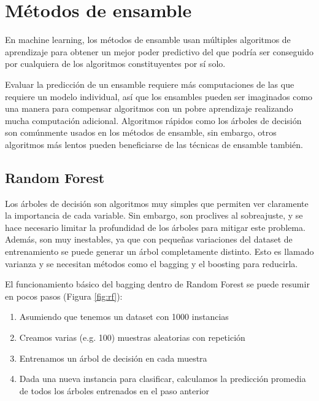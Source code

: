 \section{Métodos de ensamble}

En machine learning, los métodos de ensamble usan múltiples algoritmos de aprendizaje para obtener un mejor poder predictivo del que podría ser conseguido por cualquiera de los algoritmos constituyentes por sí solo.

Evaluar la predicción de un ensamble requiere más computaciones de las que requiere un modelo individual, así que los ensambles pueden ser imaginados como una manera para compensar algoritmos con un pobre aprendizaje realizando mucha computación adicional. Algoritmos rápidos como los árboles de decisión son comúnmente usados en los métodos de ensamble, sin embargo, otros algoritmos más lentos pueden beneficiarse de las técnicas de ensamble también.

\subsection{Random Forest}

Los árboles de decisión son algoritmos muy simples que permiten ver claramente la importancia de cada variable. Sin embargo, son proclives al sobreajuste, y se hace necesario limitar la profundidad de los árboles para mitigar este problema. Además, son muy inestables, ya que con pequeñas variaciones del dataset de entrenamiento se puede generar un árbol completamente distinto. Esto es llamado varianza y se necesitan métodos como el bagging y el boosting para reducirla.

El funcionamiento básico del bagging dentro de Random Forest se puede resumir en pocos pasos (Figura \ref{fig:rf}):

\begin{enumerate}
    \item Asumiendo que tenemos un dataset con 1000 instancias
    \item Creamos varias (e.g. 100) muestras aleatorias con repetición
    \item Entrenamos un árbol de decisión en cada muestra
    \item Dada una nueva instancia para clasificar, calculamos la predicción promedia de todos los árboles entrenados en el paso anterior
\end{enumerate}

